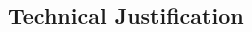 \documentclass[11pt, a4paper, onecolumn]{article}
\begin{document}
\begin{multicols}{2}
\section{Technical Justification}

\end{multicols}
\end{document}
